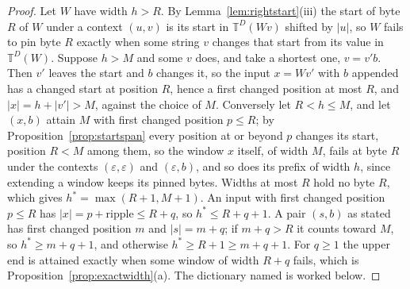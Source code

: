 \documentclass[11pt,a4paper]{article}
\theoremstyle{definition}
\theoremstyle{plain}
\newcommand{\T}{\mathbb{T}}
\begin{document}
\begin{proof}
Let \(W\) have width \(h > R\). By Lemma~\ref{lem:rightstart}(iii) the start of byte \(R\) of \(W\) under a context
\((u, v)\) is its start in \(\T^D(Wv)\) shifted by \(|u|\), so \(W\) fails to pin byte \(R\) exactly when some string
\(v\) changes that start from its value in \(\T^D(W)\). Suppose \(h > M\) and some \(v\) does, and take a shortest one,
\(v = v'b\). Then \(v'\) leaves the start and \(b\) changes it, so the input \(x = Wv'\) with \(b\) appended has a
changed start at position \(R\), hence a first changed position at most \(R\), and \(|x| = h + |v'| > M\), against the
choice of \(M\). Conversely let \(R < h \le M\), and let \((x, b)\) attain \(M\) with first changed position
\(p \le R\); by Proposition~\ref{prop:startspan} every position at or beyond \(p\) changes its start, position \(R < M\)
among them, so the window \(x\) itself, of width \(M\), fails at byte \(R\) under the contexts
\((\varepsilon, \varepsilon)\) and \((\varepsilon, b)\), and so does its prefix of width \(h\), since extending a window
keeps its pinned bytes. Widths at most \(R\) hold no byte \(R\), which gives \(h^* = \max(R + 1, M + 1)\). An input with
first changed position \(p \le R\) has \(|x| = p + \text{ripple} \le R + q\), so \(h^* \le R + q + 1\). A pair
\((s, b)\) as stated has first changed position \(m\) and \(|s| = m + q\); if \(m + q > R\) it counts toward \(M\), so
\(h^* \ge m + q + 1\), and otherwise \(h^* \ge R + 1 \ge m + q + 1\). For \(q \ge 1\) the upper end is attained exactly
when some window of width \(R + q\) fails, which is Proposition~\ref{prop:exactwidth}(a). The dictionary named is worked
below.
\end{proof}
\end{document}
